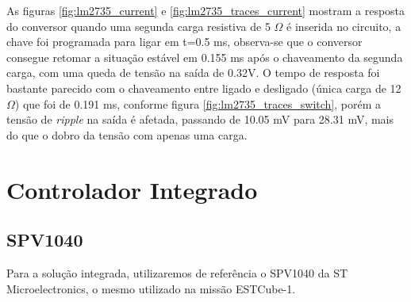 As figuras \ref{fig:lm2735_current} e \ref{fig:lm2735_traces_current} mostram a resposta do conversor quando uma segunda carga resistiva de 5 $\Omega$ é inserida no circuito, a chave foi programada para ligar em t=0.5 ms, observa-se que o conversor consegue retomar a situação estável em 0.155 ms após o chaveamento da segunda carga, com uma queda de tensão na saída de 0.32V. O tempo de resposta foi bastante parecido com o chaveamento entre ligado e desligado (única carga de 12 $\Omega$) que foi de 0.191 ms, conforme figura \ref{fig:lm2735_traces_switch}, porém a tensão de \textit{ripple} na saída é afetada, passando de 10.05 mV para 28.31 mV, mais do que o dobro da tensão com apenas uma carga.

\noindent
\begin{minipage}{\linewidth}
\label{fig:lm2735_traces_switch}
\end{minipage}

\section{Controlador Integrado}

\subsection*{SPV1040}

Para a solução integrada, utilizaremos de referência o SPV1040 \cite{spv1040_datasheet} da ST Microelectronics, o mesmo utilizado na missão ESTCube-1. 

